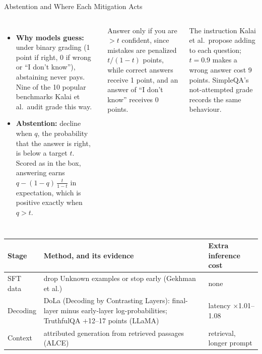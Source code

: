 \begin{frame}{Abstention and Where Each Mitigation Acts}
  \begin{columns}[T,onlytextwidth]
      \begin{itemize}\scriptsize\itemsep0.25em
        \item[\textcolor{red}{$\blacktriangleright$}] \textbf{Why models guess:} under binary grading (1 point if right, 0 if wrong or ``I don't know''), abstaining never pays. Nine of the 10 popular benchmarks Kalai et al.\ audit grade this way.
        \item[\textcolor{red}{$\blacktriangleright$}] \textbf{Abstention:} decline when $q$, the probability that the answer is right, is below a target $t$. Scored as in the box, answering earns $q - (1-q)\,\frac{t}{1-t}$ in expectation, which is positive exactly when $q > t$.
      \end{itemize}
      \begin{tcolorbox}[colframe=KAred, colback=gray!6, boxrule=0.5pt, left=4pt, right=4pt, top=3pt, bottom=3pt]
        \scriptsize Answer only if you are $>t$ confident, since mistakes are penalized $t/(1-t)$ points, while correct answers receive 1 point, and an answer of ``I don't know'' receives 0 points.
      \end{tcolorbox}
      {\scriptsize The instruction Kalai et al.\ propose adding to each question; $t = 0.9$ makes a wrong answer cost 9 points. SimpleQA's not-attempted grade records the same behaviour.\par}
  \end{columns}
  \vspace{0.3em}
  {\centering\scriptsize
  \begin{tabular}{>{\raggedright\arraybackslash}p{1.7cm} >{\raggedright\arraybackslash}p{7.4cm} >{\raggedright\arraybackslash}p{3.0cm}}
    \toprule
    \textbf{Stage} & \textbf{Method, and its evidence} & \textbf{Extra inference cost} \\
    \midrule
    SFT data & drop Unknown examples or stop early (Gekhman et al.) & none \\
    Decoding & DoLa (Decoding by Contrasting Layers): final-layer minus early-layer log-probabilities; TruthfulQA $+$12--17 points (LLaMA) & latency $\times$1.01--1.08 \\
    Context & attributed generation from retrieved passages (ALCE) & retrieval, longer prompt \\

\end{tabular}}
\end{frame}
